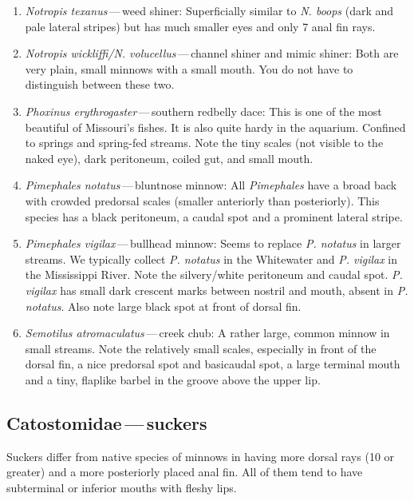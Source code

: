 \documentclass[11pt]{article}
\begin{document}
\begin{enumerate}
\item \textit{Notropis texanus}\,—\,weed shiner: Superficially similar to \textit{N. boops} (dark and pale lateral stripes) but has much smaller eyes and only 7 anal fin rays. 
\item \textit{Notropis wickliffi/N. volucellus}\,—\,channel shiner and mimic shiner: Both are very plain, small minnows with a small mouth.  You do not have to distinguish between these two.
\item \textit{Phoxinus erythrogaster}\,—\,southern redbelly dace:  This is one of the most beautiful of Missouri’s fishes.  It is also quite hardy in the aquarium.  Confined to springs and spring-fed streams.  Note the tiny scales (not visible to the naked eye), dark peritoneum, coiled gut, and small mouth. 
\item \textit{Pimephales notatus}\,—\,bluntnose minnow:  All \textit{Pimephales} have a broad back with crowded predorsal scales (smaller anteriorly than posteriorly).  This species has a black peritoneum, a caudal spot and a prominent lateral stripe.
\item \textit{Pimephales vigilax}\,—\,bullhead minnow:  Seems to replace \textit{P. notatus} in larger streams. We typically collect \textit{P. notatus} in the Whitewater and \textit{P. vigilax} in the Mississippi River. Note the silvery/white peritoneum and caudal spot.  \textit{P. vigilax} has small dark crescent marks between nostril and mouth, absent in \textit{P. notatus}. Also note large black spot at front of dorsal fin.
\item \textit{Semotilus atromaculatus}\,—\,creek chub:  A rather large, common minnow in small streams.  Note the relatively small scales, especially in front of the dorsal fin, a nice predorsal spot and basicaudal spot, a large terminal mouth and a tiny, flaplike barbel in the groove above the upper lip.
\end{enumerate}


\subsection*{Catostomidae\,—\,suckers}

Suckers differ from native species of minnows in having more dorsal rays (10 or greater) and a more posteriorly placed anal fin.  All of them tend to have subterminal or inferior mouths with fleshy lips.
\end{document}
